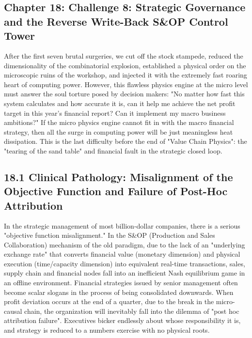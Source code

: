 \documentclass[11pt,a4paper]{article}
\begin{document}
\subsection*{Chapter 18: Challenge 8: Strategic Governance and the Reverse Write-Back S\&OP Control Tower}
After the first seven brutal surgeries, we cut off the stock stampede, reduced the dimensionality of the combinatorial explosion, established a physical order on the microscopic ruins of the workshop, and injected it with the extremely fast roaring heart of computing power. However, this flawless physics engine at the micro level must answer the soul torture posed by decision makers: "No matter how fast this system calculates and how accurate it is, can it help me achieve the net profit target in this year's financial report? Can it implement my macro business ambitions?" If the micro physics engine cannot fit in with the macro financial strategy, then all the surge in computing power will be just meaningless heat dissipation. This is the last difficulty before the end of "Value Chain Physics": the "tearing of the sand table" and financial fault in the strategic closed loop.


\subsection*{18.1 Clinical Pathology: Misalignment of the Objective Function and Failure of Post-Hoc Attribution}


In the strategic management of most billion-dollar companies, there is a serious "objective function misalignment." In the S\&OP (Production and Sales Collaboration) mechanism of the old paradigm, due to the lack of an "underlying exchange rate" that converts financial value (monetary dimension) and physical execution (time/capacity dimension) into equivalent real-time transactions, sales, supply chain and financial nodes fall into an inefficient Nash equilibrium game in an offline environment. Financial strategies issued by senior management often become scalar slogans in the process of being consolidated downwards. When profit deviation occurs at the end of a quarter, due to the break in the micro-causal chain, the organization will inevitably fall into the dilemma of "post hoc attribution failure". Executives bicker endlessly about whose responsibility it is, and strategy is reduced to a numbers exercise with no physical roots.
\end{document}
